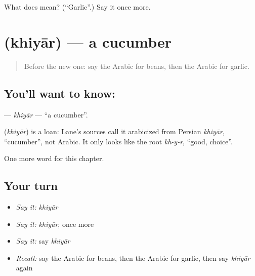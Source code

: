 \begin{tcolorbox}[breakable,colback=teal!4,colframe=teal!35!black,title={Before you move on}]
What does  mean? (\textquotedblleft{}Garlic\textquotedblright{}.) Say it once more.
\end{tcolorbox}
\section[\texorpdfstring{\ar{خيار} (khiyār)}{خيار (khiyār)}]{ (khiyār) — a cucumber}

\label{lesson:AR-C129-khiyar}



\begin{quote}
Before the new one: say the Arabic for beans, then the Arabic for garlic.
\end{quote}

\subsection*{You'll want to know: }
\textbf{} — \emph{khiyār} — \textquotedblleft{}a cucumber\textquotedblright{}.

\begin{cousinweb}
\textbf{} (\emph{khiyār}) is a loan: Lane's sources call it arabicized from Persian \emph{khiyār}, \textquotedblleft{}cucumber\textquotedblright{}, not Arabic. It only looks like the root \emph{kh-y-r}, \textquotedblleft{}good, choice\textquotedblright{}.
\end{cousinweb}

\begin{grammarlens}[title={What you've built}]
One more word for this chapter.
\end{grammarlens}

\subsection*{Your turn}
\begin{itemize}
\raggedright
  \item \emph{Say it:} \emph{khiyār}
  \item \emph{Say it:} \emph{khiyār}, once more
  \item \emph{Say it:} say \emph{khiyār}
  \item \emph{Recall:} say the Arabic for beans, then the Arabic for garlic, then say \emph{khiyār} again
\end{itemize}

